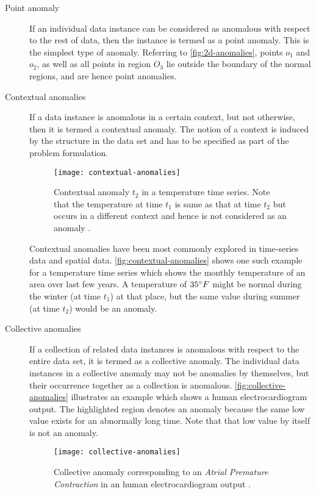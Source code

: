 \begin{description}

\item[Point anomaly] If an individual data instance can be considered as 
anomalous with respect to the rest of data, then the instance is termed as a 
point anomaly. This is the simplest type of anomaly. Referring to 
\autoref{fig:2d-anomalies}, points $o_{1}$ and $o_{2}$, as well as all points in
region $O_{3}$ lie outside the boundary of the normal regions, and are hence 
point anomalies.

\item[Contextual anomalies] If a data instance is anomalous in a certain 
context, but not otherwise, then it is termed a contextual anomaly. The notion 
of a context is induced by the structure in the data set and has to be specified
as part of the problem formulation.

\begin{figure}
	\centering
	\texttt{[image: contextual-anomalies]}
	\caption[Contextual anomaly $t_{2}$ in a temperature time series.]{
		Contextual anomaly $t_{2}$ in a temperature time series. Note that the 
		temperature at time $t_{1}$ is same as that at time $t_{2}$ but occurs 
		in a different context and hence is not considered as an anomaly 
		\cite{Chandola:2007}.}
	\label{fig:contextual-anomalies}
\end{figure}

Contextual anomalies have been most commonly explored in time-series data and 
spatial data. \autoref{fig:contextual-anomalies} shows one such example for a 
temperature time series which shows the monthly temperature of an area over last
few years. A temperature of $35^\circ F$ might be normal during the winter 
(at time $t_{1}$) at that place, but the same value during summer (at time 
$t_{2}$) would be an anomaly.

\item[Collective anomalies] If a collection of related data instances is 
anomalous with respect to the entire data set, it is termed as a collective 
anomaly. The individual data instances in a collective anomaly may not be 
anomalies by themselves, but their occurrence together as a collection is 
anomalous. \autoref{fig:collective-anomalies} illustrates an example which shows
a human electrocardiogram output. The highlighted region denotes an anomaly 
because the same low value exists for an abnormally long time. Note that that 
low value by itself is not an anomaly.

\begin{figure}
	\centering
	\texttt{[image: collective-anomalies]}
	\caption[Collective anomaly corresponding to an \emph{Atrial Premature 
		Contraction} in an human electrocardiogram output.]{Collective anomaly 
		corresponding to an \emph{Atrial Premature Contraction} in an human 
		electrocardiogram output \cite{Goldberger:2000}.}
	\label{fig:collective-anomalies}
\end{figure}

\end{description}

